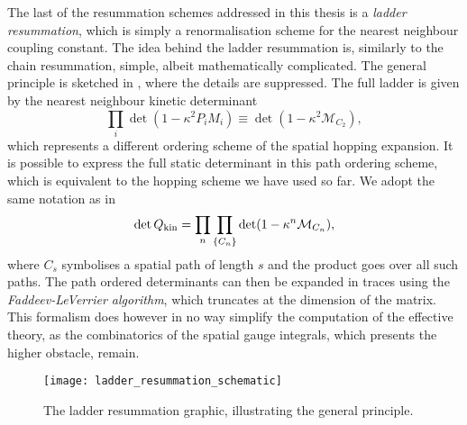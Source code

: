 The last of the resummation schemes addressed in this thesis is a \emph{ladder
  resummation}, which is simply a renormalisation scheme for the nearest
neighbour coupling constant. The idea behind the ladder resummation is,
similarly to the chain resummation, simple, albeit mathematically complicated.
The general principle is sketched in , where the
details are suppressed. The full ladder is given by the nearest neighbour
kinetic determinant
%
\begin{equation}
  \prod_i \det (1 - \kappa^2 P_i M_i) \equiv \det (1 - \kappa^2 \mathcal{M}_{C_2}),
\end{equation}
%
which represents a different ordering scheme of the spatial hopping expansion.
It is possible to express the full static determinant in this path ordering
scheme, which is equivalent to the hopping scheme we have used so far. We adopt
the same notation as in \citep{Rindlisbacher:2015pea}
%
\begin{equation}
  \det Q_{\text{kin}} = \prod_{n} \prod_{\{C_n\}} \det(1 - \kappa^n \mathcal{M}_{C_n}),
\end{equation}
%
where $C_s$ symbolises a spatial path of length $s$ and the product goes over
all such paths. The path ordered determinants can then be expanded in traces
using the \emph{Faddeev-LeVerrier algorithm}, which truncates at the dimension
of the matrix. This formalism does however in no way simplify the computation of
the effective theory, as the combinatorics of the spatial gauge integrals, which
presents the higher obstacle, remain.

\begin{figure}[t]
  \begin{center}
    \texttt{[image: ladder\_resummation\_schematic]}
  \end{center}
  \caption{The ladder resummation graphic, illustrating the general principle.}
  \label{fig:ladder_schematic}
\end{figure}

